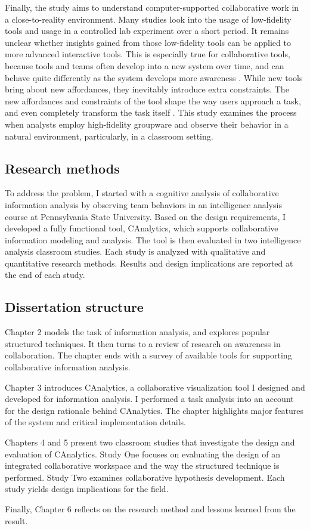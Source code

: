 Finally, the study aims to understand computer-supported collaborative work in a close-to-reality environment. Many studies look into the usage of low-fidelity tools and usage in a controlled lab experiment over a short period. It remains unclear whether insights gained from
those low-fidelity tools can be applied to more advanced interactive tools. This is especially true for collaborative tools, because tools and teams often develop into a new system over time, and can behave quite differently as the system develops more awareness \citep{Stahl2006}. While new tools bring about new affordances, they inevitably introduce extra constraints. The new affordances and constraints of the tool shape the way users approach a task, and even completely transform the
task itself \citep{Carroll1989}. This study examines the process when analysts employ high-fidelity groupware and observe their behavior in a natural environment, particularly, in a classroom setting.

\subsection{Research methods}

To address the problem, I started with a cognitive analysis of collaborative information analysis by observing team behaviors in an intelligence analysis course at Pennsylvania State University. Based on the design requirements, I developed a fully functional tool, CAnalytics, which supports collaborative information modeling and analysis. The tool is then evaluated in two intelligence analysis classroom studies. Each study is analyzed with qualitative and quantitative research methods. Results and design implications are reported at the end of each  study.

\subsection{Dissertation structure}

Chapter 2 models the task of information analysis, and explores popular structured techniques. It then turns to a review of research on awareness in collaboration. The chapter ends with a survey of available tools for supporting collaborative information analysis. 

Chapter 3 introduces CAnalytics, a collaborative visualization tool I designed and developed for information analysis. I performed a task analysis into an account for the design rationale behind CAnalytics. The chapter highlights major features of the system and critical implementation details. 

Chapters 4 and 5 present two classroom studies that investigate the design and evaluation of CAnalytics. Study One focuses on evaluating the design of an integrated collaborative workspace and the way the structured technique is performed. Study Two examines collaborative hypothesis development. Each study yields design implications for the field.

Finally, Chapter 6 reflects on the research method and lessons learned from the result. 
